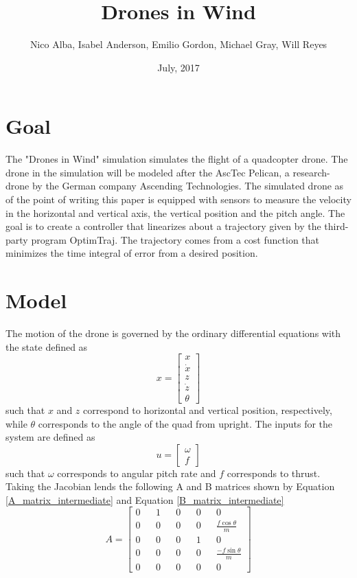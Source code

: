 \documentclass[12pt]{article}
\title{Drones in Wind}
\author{Nico Alba, Isabel Anderson, Emilio Gordon, Michael Gray, Will Reyes}
\date{July, 2017}
\begin{document}
\maketitle


\section{Goal}
The "Drones in Wind" simulation simulates the flight of a quadcopter drone. The drone in the simulation will be modeled after the AscTec Pelican, a research-drone by the German company Ascending Technologies. The simulated drone as of the point of writing this paper is equipped with sensors to measure the velocity in the horizontal and vertical axis, the vertical position and the pitch angle. The goal is to create a controller that linearizes about a trajectory given by the third-party program OptimTraj. The trajectory comes from a cost function that minimizes the time integral of error from a desired position.
\section{Model}
The motion of the drone is governed by the ordinary differential equations with the state defined as
\begin{equation}
\label{state}
x = \begin{bmatrix} x\\ \dot{x} \\ z \\ \dot{z} \\ \theta \end{bmatrix}
\end{equation}
such that $x$ and $z$ correspond to horizontal and vertical position, respectively, while $\theta$ corresponds to the angle of the quad from upright. The inputs for the system are defined as
\begin{equation}
\label{inputs}
u = \begin{bmatrix} \omega \\ f \end{bmatrix}
\end{equation}
such that $\omega$ corresponds to angular pitch rate and $f$ corresponds to thrust. Taking the Jacobian lends the following A and B matrices shown by Equation \ref{A_matrix_intermediate} and Equation \ref{B_matrix_intermediate}
\begin{equation}
\label{A_matrix_intermediate}
A = \begin{bmatrix} 0 && 1 && 0 && 0 && 0 \\ 0 && 0 && 0 && 0 && \frac{f\cos{\theta}}{m} \\  0 && 0 && 0 && 1 && 0 \\ 0 && 0 && 0 && 0 && \frac{-f\sin{\theta}}{m} \\ 0 && 0 && 0 && 0 && 0 \end{bmatrix}
\end{equation}
\end{document}
